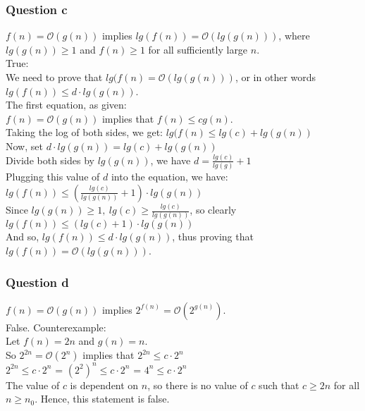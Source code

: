 \documentclass[11pt]{article}
\begin{document}
\subsubsection*{Question c}

$f(n) = \mathcal{O}(g(n))$ implies $lg(f(n)) = \mathcal{O}(lg(g(n)))$, where $lg(g(n)) \geq 1$ and $f(n) \geq 1$ for all sufficiently large $n$.\\

True: \\[6pt]
\indent We need to prove that $lg(f(n)=\mathcal{O}(lg(g(n)))$, or in other words $lg(f(n)) \leq d \cdot lg(g(n))$.\\[6pt]
\indent The first equation, as given: \\[6pt]
\indent \indent $f(n) = \mathcal{O}(g(n))$ implies that $f(n) \leq cg(n)$. \\[6pt]
\indent \indent Taking the log of both sides, we get: $lg(f(n) \leq lg(c) + lg(g(n))$\\[6pt]
\indent Now, set $d \cdot lg(g(n)) = lg(c)+lg(g(n))$\\[6pt]
\indent Divide both sides by $lg(g(n))$, we have $d= \frac{lg(c)}{lg(g)}+1$\\[6pt]
\indent Plugging this value of $d$ into the equation, we have: $lg(f(n)) \leq \left(\frac{lg(c)}{lg(g(n))}+1\right) \cdot lg(g(n))$\\[6pt]
\indent Since $lg(g(n))\geq 1, \hspace{3pt}lg(c) \geq \frac{lg(c)}{lg(g(n))}$, so clearly  $lg(f(n)) \leq (lg(c)+1) \cdot lg(g(n))$\\[6pt]
\indent And so, $lg(f(n)) \leq d \cdot lg(g(n))$, thus proving that $lg(f(n)) = \mathcal{O}(lg(g(n)))$.\\[6pt]

\subsubsection*{Question d}

$f(n) = \mathcal{O}(g(n))$ implies $2^{f(n)} = \mathcal{O}(2^{g(n)})$.\\

False. Counterexample: \\[6pt]
\indent Let $f(n) = 2n$ and $g(n) = n$. \\[6pt]
\indent So $2^{2n} = \mathcal{O}(2^{n})$ implies that $2^{2n} \leq c \cdot2^n$\\[6pt]
\indent \indent \indent \indent \indent \indent $2^{2n} \leq c \cdot2^n$ = $(2^2)^n \leq c \cdot 2^n$ = $4^n \leq c \cdot 2^n$\\[6pt]
\indent The value of $c$ is dependent on $n$, so there is no value of $c$ such that $c\geq 2n$ for all $n \geq n_0$. Hence, this statement is false.\\[6pt]
\end{document}
